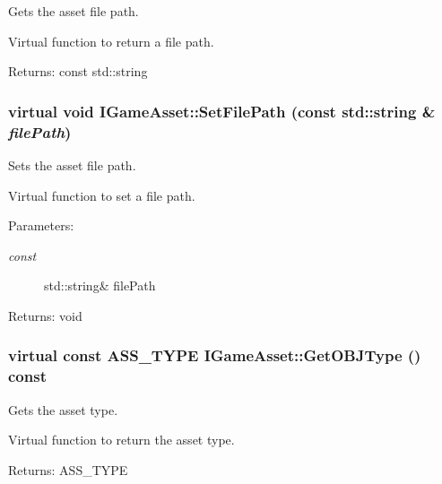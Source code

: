 Gets the asset file path. 

Virtual function to return a file path.

\begin{Desc}
\item[Returns:]const std::string \end{Desc}
\hypertarget{class_i_game_asset_60c6259d4630bc0dc1527c20e80bcc3e}{
\subsubsection[SetFilePath]{\setlength{\rightskip}{0pt plus 5cm}virtual void IGameAsset::SetFilePath (const std::string \& {\em filePath})}}
\label{class_i_game_asset_60c6259d4630bc0dc1527c20e80bcc3e}


Sets the asset file path. 

Virtual function to set a file path.

\begin{Desc}
\item[Parameters:]
\begin{description}
\item[{\em const}]std::string\& filePath \end{description}
\end{Desc}
\begin{Desc}
\item[Returns:]void \end{Desc}
\hypertarget{class_i_game_asset_b21bb7eb1227a3cfa585428197cd1919}{
\subsubsection[GetOBJType]{\setlength{\rightskip}{0pt plus 5cm}virtual const ASS\_\-TYPE IGameAsset::GetOBJType () const}}
\label{class_i_game_asset_b21bb7eb1227a3cfa585428197cd1919}


Gets the asset type. 

Virtual function to return the asset type.

\begin{Desc}
\item[Returns:]ASS\_\-TYPE \end{Desc}


